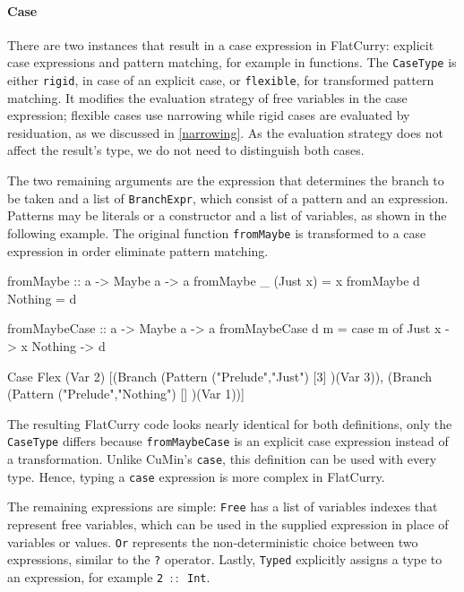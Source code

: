 \documentclass[paper = a4, fleqn, abstract=on, twoside]{scrreprt}
\newcommand{\coqinline}[1]{\texttt{#1}}
\begin{document}
\paragraph{Case}
There are two instances that result in a case expression in FlatCurry: explicit case expressions and pattern matching, for example in functions. The \coqinline{CaseType} is either \coqinline{rigid}, in case of an explicit case, or \coqinline{flexible}, for transformed pattern matching. It modifies the evaluation strategy of free variables in the case expression; flexible cases use narrowing while rigid cases are evaluated by residuation, as we discussed in \autoref{narrowing}. As the evaluation strategy does not affect the result's type, we do not need to distinguish both cases.
\par
The two remaining arguments are the expression that determines the branch to be taken and a list of \coqinline{BranchExpr}, which consist of a pattern and an expression. Patterns may be literals or a constructor and a list of variables, as shown in the following example. The original function \texttt{fromMaybe} is transformed to a case expression in order eliminate pattern matching.\\
\par
\begin{minipage}[t]{.5\linewidth}
\begin{haskellcode}
fromMaybe :: a -> Maybe a -> a
fromMaybe _ (Just x) = x
fromMaybe d Nothing  = d
\end{haskellcode}
\end{minipage}
\begin{minipage}[t]{.5\linewidth}
\begin{haskellcode}
fromMaybeCase :: a -> Maybe a -> a
fromMaybeCase d m = case m of
                      Just x  -> x
                      Nothing -> d
\end{haskellcode}
\end{minipage}
\begin{coqcode}
Case Flex (Var 2) [(Branch (Pattern ("Prelude","Just") [3] )(Var 3)),
                   (Branch (Pattern ("Prelude","Nothing") [] )(Var 1))]
\end{coqcode}
The resulting FlatCurry code looks nearly identical for both definitions, only the \coqinline{CaseType} differs because \texttt{fromMaybeCase} is an explicit case expression instead of a transformation. Unlike CuMin's \texttt{case}, this definition can be used with every type. Hence, typing a \texttt{case} expression is more complex in FlatCurry.\\
\par \noindent
The remaining expressions are simple: \texttt{Free} has a list of variables indexes that represent free variables, which can be used in the supplied expression in place of variables or values. \texttt{Or} represents the non-deterministic choice between two expressions, similar to the \texttt{?} operator. Lastly, \texttt{Typed} explicitly assigns a type to an expression, for example \mbox{\texttt{2 $::$ Int}}.
\end{document}
